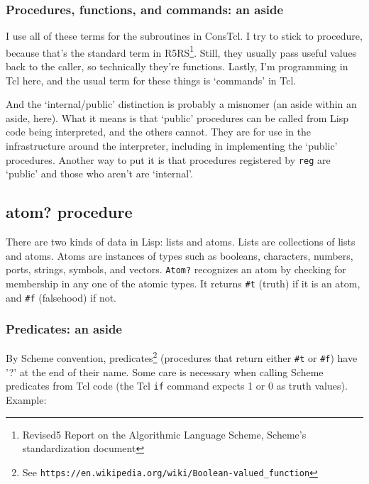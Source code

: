 \documentclass[twoside,9pt]{report}
\begin{document}
\subsubsection{Procedures, functions, and commands: an aside}
\label{procedures,-functions,-and-commands-an-aside}


I use all of these terms for the subroutines in ConsTcl. I try to stick to procedure, because that's the standard term in R5RS\footnote{Revised5 Report on the Algorithmic Language Scheme, Scheme's standardization document}. Still, they usually pass useful values back to the caller, so technically they're functions. Lastly, I'm programming in Tcl here, and the usual term for these things is `commands' in Tcl.


And the `internal/public' distinction is probably a misnomer (an aside within an aside, here). What it means is that `public' procedures can be called from Lisp code being interpreted, and the others cannot. They are for use in the infrastructure around the interpreter, including in implementing the `public' procedures. Another way to put it is that procedures registered by \texttt{reg} are `public' and those who aren't are `internal'.

\subsection{atom? procedure}
\label{atom?-procedure}


There are two kinds of data in Lisp: lists and atoms. Lists are collections of lists and atoms. Atoms are instances of types such as booleans, characters, numbers, ports, strings, symbols, and vectors. \texttt{Atom?} recognizes an atom by checking for membership in any one of the atomic types. It returns \texttt{\#t} (truth) if it is an atom, and \texttt{\#f} (falsehood) if not.

\subsubsection{Predicates: an aside}
\label{predicates-an-aside}

By Scheme convention, predicates\footnote{See \texttt{https://en.wikipedia.org/wiki/Boolean-valued\_function}} (procedures that return either \texttt{\#t} or \texttt{\#f}) have '?' at the end of their name. Some care is necessary when calling Scheme predicates from Tcl code (the Tcl \texttt{if} command expects 1 or 0 as truth values). Example:
\end{document}
